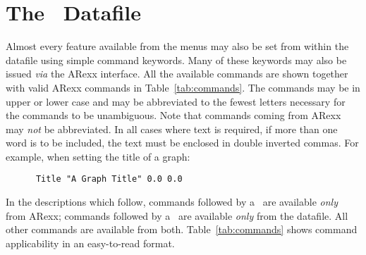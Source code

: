 
\chapter{The \amplot\ Datafile}
\label{ch:datafile}
Almost every feature available from the menus may also be set from within 
the datafile using simple command keywords. Many of these keywords may also be issued 
{\em via\/} the ARexx interface. All the available commands are shown 
together with valid ARexx commands in Table~\ref{tab:commands}. 
The commands may be in upper or lower case and may be abbreviated to the 
fewest letters necessary for the commands to be unambiguous. Note that 
commands coming from ARexx may {\em not\/} be abbreviated. In all cases 
where text is required, if more than one word is to be included,
the text must be enclosed in double inverted commas. For example, when 
setting the title of a graph:
\begin{verbatim}
      Title "A Graph Title" 0.0 0.0
\end{verbatim}

In the descriptions which follow, commands followed by a \dag\ are available {\em 
only\/} from ARexx; commands followed by a \ddag\ are available {\em only\/} from 
the datafile. All other commands are available from both. Table~\ref{tab:commands} 
shows command applicability in an easy-to-read format.

